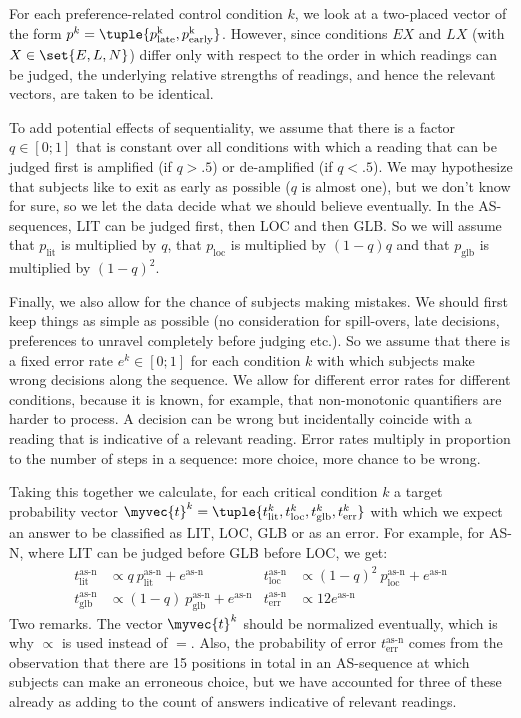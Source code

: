 \documentclass[fleqn,reqno,10pt]{article}
\begin{document}
For each preference-related control condition $k$, we look at a
two-placed vector of the form $p^k =
\tuple{p^{\text{k}}_{\text{late}},
  p^{\text{k}}_{\text{early}}}$. However, since conditions $EX$ and
$LX$ (with $X \in \set{E,L,N}$) differ only with respect to the order
in which readings can be judged, the underlying relative strengths of
readings, and hence the relevant vectors, are taken to be identical.

To add potential effects of sequentiality, we assume that there is a
factor $q \in [0;1]$ that is constant over all conditions with which a
reading that can be judged first is amplified (if $q > .5$) or
de-amplified (if $q <.5$). We may hypothesize that subjects like to
exit as early as possible ($q$ is almost one), but we don't know for
sure, so we let the data decide what we should believe eventually. In
the AS-sequences, LIT can be judged first, then LOC and then GLB. So
we will assume that $p_{\text{lit}}$ is multiplied by $q$, that
$p_{\text{loc}}$ is multiplied by $(1-q)q$ and that $p_{\text{glb}}$
is multiplied by $(1-q)^2$.

Finally, we also allow for the chance of subjects making mistakes. We
should first keep things as simple as possible (no consideration for
spill-overs, late decisions, preferences to unravel completely before
judging etc.). So we assume that there is a fixed error rate $e^k \in
[0;1]$ for each condition $k$ with which subjects make wrong decisions
along the sequence. We allow for different error rates for different
conditions, because it is known, for example, that non-monotonic
quantifiers are harder to process. A decision can be wrong but
incidentally coincide with a reading that is indicative of a relevant
reading. Error rates multiply in proportion to the number of steps in
a sequence: more choice, more chance to be wrong.

Taking this together we calculate, for each critical condition $k$ a
target probability vector $\myvec{t}^k =
\tuple{t^k_{\text{lit}},t^k_{\text{loc}},t^k_{\text{glb}},t^k_{\text{err}}}$
with which we expect an answer to be classified as LIT, LOC, GLB or as
an error. For example, for AS-N, where LIT can be judged before GLB
before LOC, we get:
\begin{align*}
  t^{\text{as-n}}_{\text{lit}} & \propto q \
  p^\text{as-n}_{\text{lit}} + e^\text{as-n} &   t^{\text{as-n}}_{\text{loc}} & \propto (1-q)^2 \
  p^\text{as-n}_{\text{loc}} + e^\text{as-n} \\
  t^{\text{as-n}}_{\text{glb}} & \propto (1-q) \
  p^\text{as-n}_{\text{glb}} + e^\text{as-n} &   t^{\text{as-n}}_{\text{err}} &
  \propto 12 e^\text{as-n}
\end{align*}
Two remarks. The vector $\myvec{t}^k$ should be normalized eventually,
which is why $\propto$ is used instead of $=$. Also, the probability
of error $t^{\text{as-n}}_{\text{err}}$ comes from the observation
that there are 15 positions in total in an AS-sequence at which
subjects can make an erroneous choice, but we have accounted for three
of these already as adding to the count of answers indicative of
relevant readings.
\end{document}
